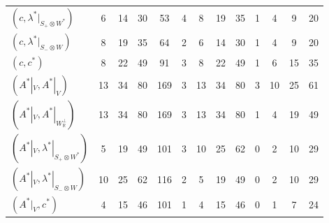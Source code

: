 \begin{tabular}{l|cccc|cccc|cccc}
$(c,\lambda^*|_{S_+\otimes W^*})$ & 6 & 14 & 30 & 53 & 4 & 8 & 19 & 35 & 1 & 4 & 9 & 20\\
$(c,\lambda^*|_{S_-\otimes W})$ & 8 & 19 & 35 & 64 & 2 & 6 & 14 & 30 & 1 & 4 & 9 & 20\\
$(c,c^*)$ & 8 & 22 & 49 & 91 & 3 & 8 & 22 & 49 & 1 & 6 & 15 & 35\\
$(A^*|_V,A^*|_V)$ & 13 & 34 & 80 & 169 & 3 & 13 & 34 & 80 & 3 & 10 & 25 & 61\\
$(A^*|_V,A^*|_{W_{\mathbb R}^\perp})$ & 13 & 34 & 80 & 169 & 3 & 13 & 34 & 80 & 1 & 4 & 19 & 49\\
$(A^*|_V,\lambda^*|_{S_+\otimes W^*})$ & 5 & 19 & 49 & 101 & 3 & 10 & 25 & 62 & 0 & 2 & 10 & 29\\
$(A^*|_V,\lambda^*|_{S_-\otimes W})$ & 10 & 25 & 62 & 116 & 2 & 5 & 19 & 49 & 0 & 2 & 10 & 29\\
$(A^*|_V,c^*)$ & 4 & 15 & 46 & 101 & 1 & 4 & 15 & 46 & 0 & 1 & 7 & 24\\
\end{tabular}
